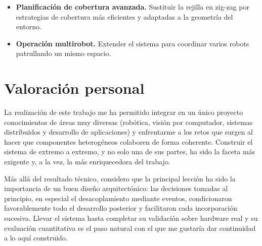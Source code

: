 \begin{itemize}
%
\begin{yamlcode}[title={Servicio de inferencia con vLLM (vllm/docker-compose.yml)}, label={lst:vllm}]
services:
  vllm:
    image: vllm/vllm-openai:latest
    container_name: qwen25-vl-3b
    runtime: nvidia
    deploy:
      resources:
        reservations:
          devices:
            - driver: nvidia
              count: all
              capabilities: [gpu]
    shm_size: "8gb"
    volumes:
      - ~/.cache/huggingface:/root/.cache/huggingface
    ports:
      - "8000:8000"
    ipc: host
    command: >
      --model unsloth/Qwen2.5-VL-3B-Instruct-unsloth-bnb-4bit
      --tokenizer Qwen/Qwen2.5-VL-3B-Instruct
      --served-model-name qwen2.5-vl-3b
      --quantization bitsandbytes
      --load-format bitsandbytes
      --dtype bfloat16
      --max-model-len 32768
      --gpu-memory-utilization 0.8
      --max-num-seqs 4
      --limit-mm-per-prompt '{"image":2}'
      --trust-remote-code
    restart: unless-stopped
\end{yamlcode}%

  \item \textbf{Planificación de cobertura avanzada.} Sustituir la rejilla en zig-zag por
    estrategias de cobertura más eficientes y adaptadas a la geometría del entorno.
  \item \textbf{Operación multirobot.} Extender el sistema para coordinar varios robots
    patrullando un mismo espacio.
\end{itemize}



\section{Valoración personal}
\label{sec:valoracion-personal}

La realización de este trabajo me ha permitido integrar en un único proyecto conocimientos
de áreas muy diversas (robótica, visión por computador, sistemas distribuidos y desarrollo
de aplicaciones) y enfrentarme a los retos que surgen al hacer que componentes heterogéneos
colaboren de forma coherente. Construir el sistema de extremo a extremo, y no solo una de
sus partes, ha sido la faceta más exigente y, a la vez, la más enriquecedora del trabajo.

Más allá del resultado técnico, considero que la principal lección ha sido la importancia de
un buen diseño arquitectónico: las decisiones tomadas al principio, en especial el
desacoplamiento mediante eventos, condicionaron favorablemente todo el desarrollo posterior
y facilitaron cada incorporación sucesiva. Llevar el sistema hasta completar su validación
sobre hardware real y su evaluación cuantitativa es el paso natural con el que me
gustaría dar continuidad a lo aquí construido.

